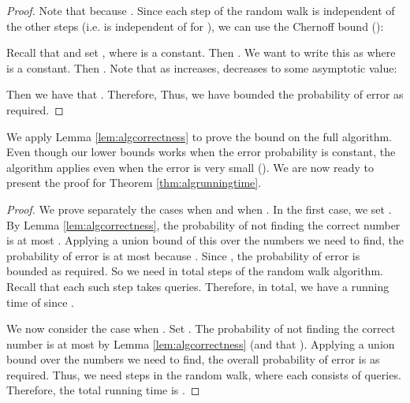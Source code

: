 \documentclass[12pt]{article}
\begin{document}
\begin{proof}
Note that  because . Since each step of the random walk is independent of the other steps (i.e.  is independent of  for ), we can use the Chernoff bound (\cite{Lehman}):

Recall that  and set , where  is a constant. Then . We want to write this as  where  is a constant. Then . Note that as  increases,  decreases to some asymptotic value: 


Then we have that . Therefore,  Thus, we have bounded the probability of error as required.
\end{proof}

We apply Lemma \ref{lem:algcorrectness} to prove the bound on the full algorithm.  
Even though our lower bounds works when the error probability is constant, the algorithm applies even when the error is very small ().  We are now ready to present the proof for Theorem \ref{thm:algrunningtime}.

\begin{proof}
We prove separately the cases when  and when . In the first case, we set . By Lemma \ref{lem:algcorrectness}, the probability of not finding the correct  number is at most . Applying a union bound of this over the  numbers we need to find, the probability of error is at most  because . Since , the probability of error is bounded as required. So we need in total  steps of the random walk algorithm. Recall that each such step takes  queries. Therefore, in total, we have a running time of  since . 

We now consider the case when . Set . The probability of not finding the correct  number is at most  by Lemma \ref{lem:algcorrectness} (and that ). Applying a union bound over the  numbers we need to find, the overall probability of error is  as required. Thus, we need  steps in the random walk, where each consists of  queries. Therefore, the total running time is .
\end{proof}
\end{document}
